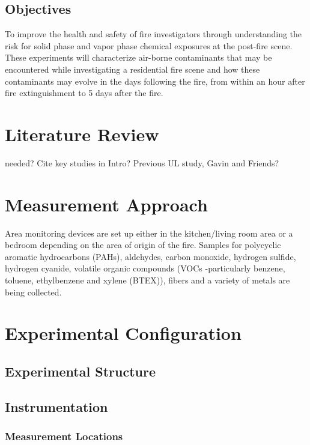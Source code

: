 \documentclass[12pt,oneside]{book}
\begin{document}
\section{Objectives}

To improve the health and safety of fire investigators through understanding the risk for solid phase and vapor phase chemical exposures at the post-fire scene.  These experiments will characterize air-borne contaminants that may be encountered while investigating a residential fire scene and how these contaminants may evolve in the days following the fire, from within an hour after fire extinguishment to 5 days after the fire.          


\chapter{Literature Review}
\label{chap:lit_review}

needed?   Cite key studies in Intro?  Previous UL study, Gavin and Friends? 

\chapter{Measurement Approach}

Area monitoring devices are set up either in the kitchen/living room area or a bedroom depending on the area of origin of the fire.  Samples for polycyclic aromatic hydrocarbons (PAHs), aldehydes, carbon monoxide, hydrogen sulfide, hydrogen cyanide, volatile organic compounds (VOCs -particularly benzene, toluene, ethylbenzene and xylene (BTEX)), fibers and a variety of metals are being collected.  

\chapter{Experimental Configuration}
\label{chap:exp_config}

\section{Experimental Structure}

\section{Instrumentation}
\label{sec:instrument}

\subsection{Measurement Locations}
\label{subsec:measure_locs}
\end{document}
